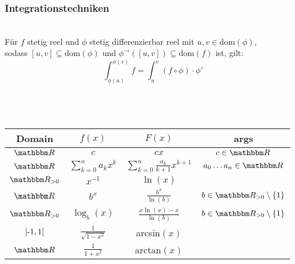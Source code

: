 \subsubsection*{Integrationstechniken}
\textsc{}\\
    Für \(f\) stetig reel und \(\phi\) stetig differenzierbar reel mit \(u,v \in \text{dom}(\phi)\),\\
    sodass \([u,v] \subseteq \text{dom}(\phi)\) und \(\phi^\rightarrow([u,v]) \subseteq \text{dom}(f)\) ist, gilt:
    \[\int_{\phi(u)}^{\phi(v)}f = \int_{u}^{v}(f \circ \phi) \cdot \phi'\] \\
 \\ \\
\begin{tabular}{ c | c | c | c }
    \hline
    Domain & \(f(x)\) & \(F(x)\) & args \\
    \hline
    \(\R\) & \(c\) & \(cx\) & \(c \in \R\) \\
    \(\R\) & \(\sum_{k=0}^{n}a_kx^k\) & \(\sum_{k=0}^{n}\frac{a_k}{k+1}x^{k+1}\) & \(a_0 \dots a_n \in \R\) \\
    \(\R_{> 0}\) & \(x^{-1}\) & \(\ln(x)\) & \\
    \(\R\) & \(b^x\) & \(\frac{b^x}{\ln(b)}\) & \(b \in \R_{>0} \setminus \{1\}\) \\
    \(\R_{> 0}\) & \(\log_b(x)\) & \(\frac{x\ln(x) - x}{\ln(b)}\) & \(b \in \R_{>0} \setminus \{1\}\) \\
    \(]\text{-} 1, 1[\) & \(\frac{1}{\sqrt{1-x^2}}\) & arcsin\((x)\) & \\
    \(\R\) & \(\frac{1}{1+x^2}\) & arctan\((x)\) & 
\end{tabular}
